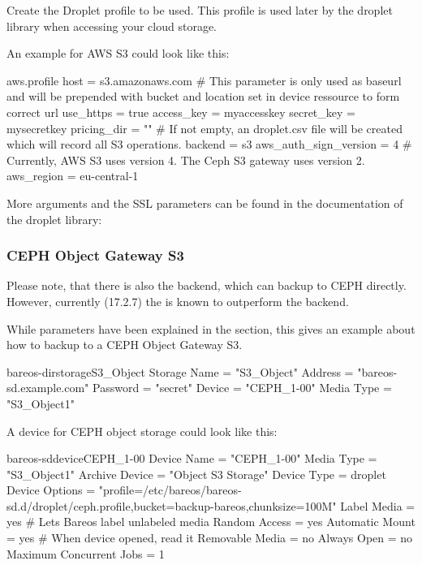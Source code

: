 Create the Droplet profile to be used.
This profile is used later by the droplet library when accessing your cloud storage.

An example for AWS S3 could look like this:

\begin{config}{aws.profile}
host = s3.amazonaws.com         # This parameter is only used as baseurl and will be prepended with bucket and location set in device ressource to form correct url
use_https = true
access_key = myaccesskey
secret_key = mysecretkey
pricing_dir = ""                # If not empty, an droplet.csv file will be created which will record all S3 operations.
backend = s3
aws_auth_sign_version = 4       # Currently, AWS S3 uses version 4. The Ceph S3 gateway uses version 2.
aws_region = eu-central-1
\end{config}


More arguments and the SSL parameters can be found in the documentation of the droplet library:
\externalReferenceDropletDocConfigurationFile


\subsubsection{CEPH Object Gateway S3}

Please note, that there is also the  backend,
which can backup to CEPH directly. However, currently (17.2.7) the  is known to outperform the  backend.

While parameters have been explained in the  section, this gives an example about how to backup to a CEPH Object Gateway S3.

\begin{bareosConfigResource}{bareos-dir}{storage}{S3\_Object}
Storage {
    Name = "S3_Object"
    Address  = "bareos-sd.example.com"
    Password = "secret"
    Device = "CEPH_1-00"
    Media Type = "S3_Object1"
}
\end{bareosConfigResource}


A device for CEPH object storage could look like this:
\begin{bareosConfigResource}{bareos-sd}{device}{CEPH\_1-00}
Device {
  Name = "CEPH_1-00"
  Media Type = "S3_Object1"
  Archive Device = "Object S3 Storage"
  Device Type = droplet
  Device Options = "profile=/etc/bareos/bareos-sd.d/droplet/ceph.profile,bucket=backup-bareos,chunksize=100M"
  Label Media = yes                    # Lets Bareos label unlabeled media
  Random Access = yes
  Automatic Mount = yes                # When device opened, read it
  Removable Media = no
  Always Open = no
  Maximum Concurrent Jobs = 1
}
\end{bareosConfigResource}


